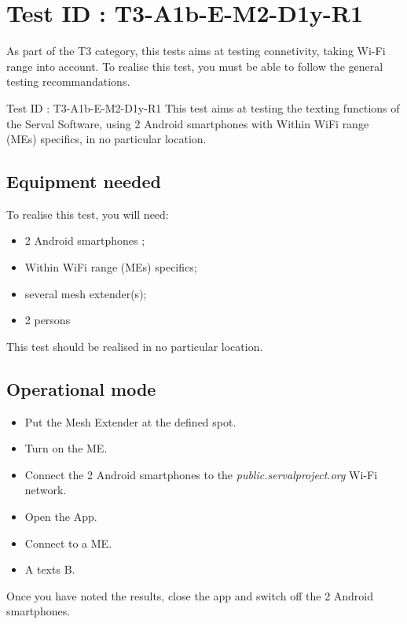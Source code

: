 \documentclass[oneside]{book}
\begin{document}
\section{Test ID : T3-A1b-E-M2-D1y-R1}
\begin{itshape}
As part of the T3 category, this tests aims at testing connetivity, taking Wi-Fi range into account.
To realise this test, you must be able to follow the general testing recommandations.
\end{itshape}
\newline
Test ID : T3-A1b-E-M2-D1y-R1
 This test aims at testing the texting functions of the Serval Software, using 2 Android smartphones with Within WiFi range (MEs)  specifics, in no particular location.
\subsection{Equipment needed} To realise this test, you will need:
\begin{itemize}
\item 2 Android smartphones ;
\item Within WiFi range (MEs)  specifics;
\item several mesh extender(s);
\item 2 persons
\end{itemize}
This test should be realised in no particular location.
\subsection{Operational mode} \begin{itemize}
\item Put the Mesh Extender at the defined spot.
\item Turn on the ME.
\item Connect the 2 Android smartphones to the \emph{public.servalproject.org} Wi-Fi network.
\item Open the App.
\item Connect to a ME.
\item A texts B.
\end{itemize}
Once you have noted the results, close the app and switch off the 2 Android smartphones.
\end{document}
